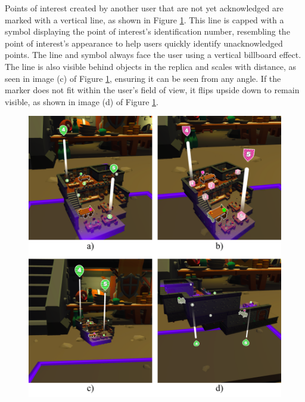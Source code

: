         Points of interest created by another user that are not yet acknowledged are marked with a vertical line, as shown in Figure \ref{fig:poi_marker}. This line is capped with a symbol displaying the point of interest's identification number, resembling the point of interest's appearance to help users quickly identify unacknowledged points. The line and symbol always face the user using a vertical billboard effect. The line is also visible behind objects in the replica and scales with distance, as seen in image (c) of Figure \ref{fig:poi_marker}, ensuring it can be seen from any angle. If the marker does not fit within the user's field of view, it flips upside down to remain visible, as shown in image (d) of Figure \ref{fig:poi_marker}.

       \begin{figure}[h!]
            \centering
            \includegraphics[width=1\textwidth, height=1\textheight, keepaspectratio]{figures/poi_marker.png}
            \label{fig:poi_marker}
        \end{figure}
        
